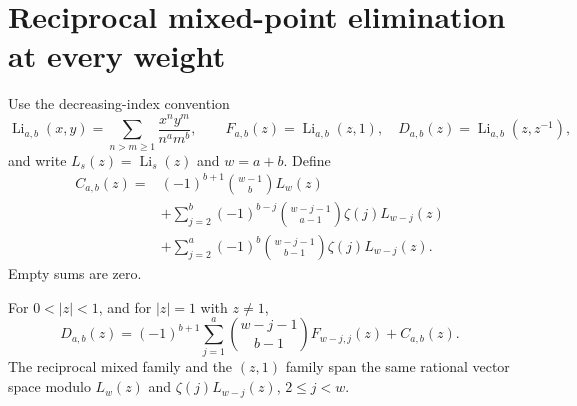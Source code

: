 \begingroup
\newcommand{\pgLi}{\operatorname{Li}}
\section{Reciprocal mixed-point elimination at every weight}
\label{gapcont:section}
Use the decreasing-index convention
\[
\pgLi_{a,b}(x,y)=\sum_{n>m\ge1}\frac{x^ny^m}{n^am^b},\qquad
F_{a,b}(z)=\pgLi_{a,b}(z,1),\quad D_{a,b}(z)=\pgLi_{a,b}(z,z^{-1}),
\]
and write $L_s(z)=\pgLi_s(z)$ and $w=a+b$. Define
\begin{align*}
C_{a,b}(z)={}&(-1)^{b+1}\binom{w-1}{b}L_w(z)\\
&+\sum_{j=2}^{b}(-1)^{b-j}\binom{w-j-1}{a-1}\zeta(j)L_{w-j}(z)\\
&+\sum_{j=2}^{a}(-1)^b\binom{w-j-1}{b-1}\zeta(j)L_{w-j}(z).
\end{align*}
Empty sums are zero.
\begin{theorem}\label{gapcont:elimination}
For $0<|z|<1$, and for $|z|=1$ with $z\ne1$,
\begin{equation}\label{gapcont:formula}
D_{a,b}(z)=(-1)^{b+1}\sum_{j=1}^{a}
\binom{w-j-1}{b-1}F_{w-j,j}(z)+C_{a,b}(z).
\end{equation}
The reciprocal mixed family and the $(z,1)$ family span the same rational
vector space modulo $L_w(z)$ and $\zeta(j)L_{w-j}(z)$, $2\le j<w$.
\end{theorem}
